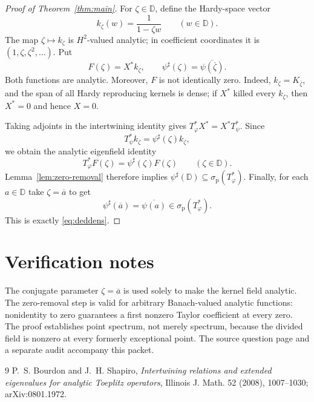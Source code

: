 \documentclass[10pt]{article}
\newcommand{\D}{\mathbb D}
\newcommand{\Hp}{H^2}
\newcommand{\spt}{\sigma_{\mathrm p}}
\begin{document}
\begin{proof}[Proof of Theorem~\ref{thm:main}]
For $\zeta\in\D$, define the Hardy-space vector
\[
 k_\zeta(w)=\frac{1}{1-\zeta w}\qquad(w\in\D).
\]
The map $\zeta\mapsto k_\zeta$ is $\Hp$-valued analytic; in coefficient
coordinates it is $(1,\zeta,\zeta^2,\ldots)$.  Put
\[
 F(\zeta)=X^*k_\zeta,
 \qquad
 \psi^\sharp(\zeta)=\overline{\psi(\overline\zeta)}.
\]
Both functions are analytic.  Moreover, $F$ is not identically zero.  Indeed,
$k_\zeta=K_{\overline\zeta}$, and the span of all Hardy reproducing kernels
is dense; if $X^*$ killed every $k_\zeta$, then $X^*=0$ and hence $X=0$.

Taking adjoints in the intertwining identity gives
$T_\varphi^*X^*=X^*T_\psi^*$.  Since
\[
 T_\psi^*k_\zeta=\psi^\sharp(\zeta)k_\zeta,
\]
we obtain the analytic eigenfield identity
\[
 T_\varphi^*F(\zeta)=\psi^\sharp(\zeta)F(\zeta)
 \qquad(\zeta\in\D).
\]
Lemma~\ref{lem:zero-removal} therefore implies
$\psi^\sharp(\D)\subseteq\spt(T_\varphi^*)$.  Finally,
for each $a\in\D$ take $\zeta=\overline a$ to get
\[
 \psi^\sharp(\overline a)=\overline{\psi(a)}
 \in\spt(T_\varphi^*).
\]
This is exactly \eqref{eq:deddens}.
\end{proof}

\section*{Verification notes}

The conjugate parameter $\zeta=\overline a$ is used solely to make the
kernel field analytic.  The zero-removal step is valid for arbitrary
Banach-valued analytic functions: nonidentity to zero guarantees a first
nonzero Taylor coefficient at every zero.  The proof establishes point
spectrum, not merely spectrum, because the divided field is nonzero at every
formerly exceptional point.  The source question page and a separate audit
accompany this packet.

\begin{thebibliography}{9}
P.~S. Bourdon and J.~H. Shapiro,
\emph{Intertwining relations and extended eigenvalues for analytic Toeplitz
operators}, Illinois J. Math. 52 (2008), 1007--1030;
arXiv:0801.1972.
\end{thebibliography}
\end{document}
